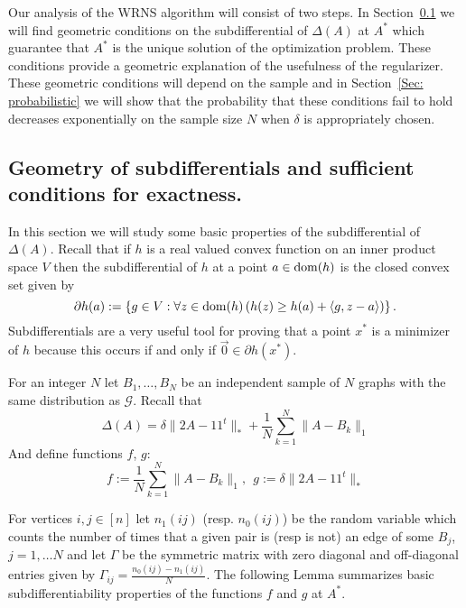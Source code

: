 \documentclass[12pt]{amsart}
\theoremstyle{remark}
\newcommand{\grG}{{\mathcal{G}}}
\begin{document}
Our analysis of the WRNS algorithm will consist of two steps. In Section~\ref{Sec: subdifferential} we will find geometric conditions on the subdifferential of $\Delta(A)$ at $A^*$ which guarantee that $A^*$ is the unique solution of the optimization problem. These conditions provide a geometric explanation of the usefulness of the regularizer. These geometric conditions will depend on the sample and in Section~\ref{Sec: probabilistic} we will show that the probability that these conditions fail to hold decreases exponentially on the sample size $N$ when $\delta$ is appropriately chosen.


\subsection{Geometry of subdifferentials and sufficient conditions for exactness.}
\label{Sec: subdifferential}

In this section we will study some basic properties of the subdifferential of $\Delta(A)$. Recall that if $h$ is a real valued convex function on an inner product space $V$ then the subdifferential of $h$ at a point $a\in {\rm dom}(h)$ is the closed convex set given by
\[ \partial h(a):=\left\{g\in V: \forall z\in {\rm dom}(h)\left(h(z)\geq h(a)+\langle g, z-a\rangle\right)\right\}.\]
Subdifferentials are a very useful tool for proving that a point $x^*$ is a minimizer of $h$ because this occurs if and only if $\vec{0}\in \partial h(x^*)$. 

For an integer $N$ let $B_1,\dots, B_N$ be an independent sample of $N$ graphs with the same distribution as $\grG$. Recall that 
\[\Delta(A)= \delta\|2A-11^t\|_{*}+\frac{1}{N}\sum_{k=1}^N\|A-B_k\|_1\] 
And define functions $f$, $g$:
\[
f:= \frac{1}{N}\sum_{k=1}^N\|A-B_k\|_1, \ \ g:= \delta\|2A-11^t\|_{*}
\]

For vertices $i,j\in [n]$ let $n_1(ij)$ (resp. $n_0(ij)$) be the random variable which counts the number of times that a given pair is (resp is not) an edge of some $B_j$, $j=1,\dots N$ and let $\Gamma$ be the symmetric matrix with zero diagonal and off-diagonal entries given by $\Gamma_{ij}=\frac{n_0(ij)-n_1(ij)}{N}$. The following Lemma summarizes basic subdifferentiability properties of the functions $f$ and $g$ at $A^*$.
\end{document}
